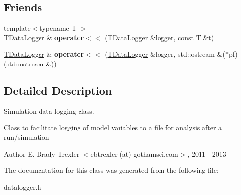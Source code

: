 \subsection*{Friends}
\begin{DoxyCompactItemize}
\item 
\hypertarget{class_t_data_logger_a50ceac6f24eeb145e75822ca7a0bb697}{{\footnotesize template$<$typename T $>$ }\\\hyperlink{class_t_data_logger}{T\+Data\+Logger} \& {\bfseries operator$<$$<$} (\hyperlink{class_t_data_logger}{T\+Data\+Logger} \&logger, const T \&t)}\label{class_t_data_logger_a50ceac6f24eeb145e75822ca7a0bb697}

\item 
\hypertarget{class_t_data_logger_aac169f84ef7aa88fbfe52dfbf93bf987}{\hyperlink{class_t_data_logger}{T\+Data\+Logger} \& {\bfseries operator$<$$<$} (\hyperlink{class_t_data_logger}{T\+Data\+Logger} \&logger, std\+::ostream \&($\ast$pf)(std\+::ostream \&))}\label{class_t_data_logger_aac169f84ef7aa88fbfe52dfbf93bf987}

\end{DoxyCompactItemize}


\subsection{Detailed Description}
Simulation data logging class. 

Class to facilitate logging of model variables to a file for analysis after a run/simulation

\begin{DoxyAuthor}{Author}
E. Brady Trexler $<$ebtrexler (at) gothamsci.\+com$>$, 2011 -\/ 2013 
\end{DoxyAuthor}


The documentation for this class was generated from the following file\+:\begin{DoxyCompactItemize}
\item 
datalogger.\+h\end{DoxyCompactItemize}
